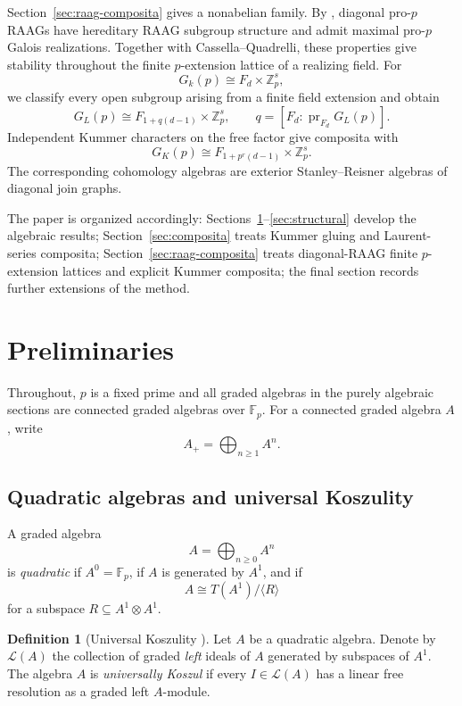 \documentclass[12pt]{amsart}
\theoremstyle{plain}
\theoremstyle{definition}
\newtheorem{definition}[theorem]{Definition}
\theoremstyle{remark}
\numberwithin{equation}{section}
\newcommand{\Fp}{\mathbb{F}_p}
\begin{document}
Section~\ref{sec:raag-composita} gives a nonabelian family. By
\cite[Theorem~1.2]{SnopceZalesskii}, diagonal pro-\(p\) RAAGs have
hereditary RAAG subgroup structure and admit maximal pro-\(p\) Galois
realizations. Together with Cassella--Quadrelli, these properties give
stability throughout the finite \(p\)-extension lattice of a realizing field. For
\[
G_k(p)\cong F_d\times\mathbb Z_p^s,
\]
we classify every open subgroup arising from a finite field extension and
obtain
\[
G_L(p)\cong F_{1+q(d-1)}\times\mathbb Z_p^s,
\qquad
q=[F_d:\operatorname{pr}_{F_d}G_L(p)].
\]
Independent Kummer characters on the free factor give composita with
\[
G_K(p)\cong F_{1+p^r(d-1)}\times\mathbb Z_p^s.
\]
The corresponding cohomology algebras are exterior Stanley--Reisner algebras
of diagonal join graphs.

The paper is organized accordingly: Sections~\ref{sec:prelim}--\ref{sec:structural}
develop the algebraic results; Section~\ref{sec:composita} treats Kummer
gluing and Laurent-series composita; Section~\ref{sec:raag-composita}
treats diagonal-RAAG finite \(p\)-extension lattices and explicit Kummer
composita; the final section records further extensions of the method.

\section{Preliminaries}\label{sec:prelim}

Throughout, \(p\) is a fixed prime and all graded algebras in the
purely algebraic sections are connected graded algebras over
\(\Fp\). For a connected graded algebra \(A\), write
\[
A_+=\bigoplus_{n\geq 1}A^n.
\]

\subsection{Quadratic algebras and universal Koszulity}

A graded algebra
\[
A=\bigoplus_{n\geq0}A^n
\]
is \emph{quadratic} if \(A^0=\Fp\), if \(A\) is generated by \(A^1\),
and if
\[
A\cong T(A^1)/\langle R\rangle
\]
for a subspace \(R\subseteq A^1\otimes A^1\).

\begin{definition}[Universal Koszulity
{\cite{ConcaUniversallyKoszul,MinacPalaistiPasiniTan}}]
\label{def:uk}
Let \(A\) be a quadratic algebra. Denote by \(\mathcal L(A)\) the
collection of graded \emph{left} ideals of \(A\) generated by
subspaces of \(A^1\). The algebra \(A\) is \emph{universally Koszul}
if every \(I\in\mathcal L(A)\) has a linear free resolution as a
graded left \(A\)-module.
\end{definition}
\end{document}
